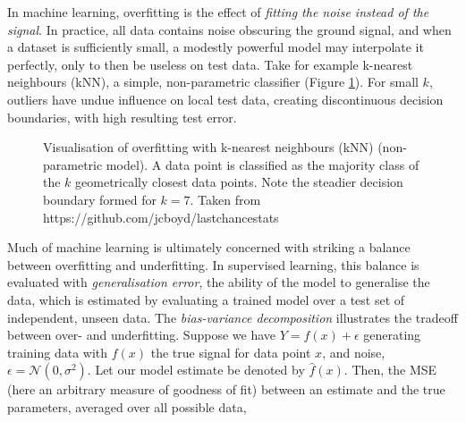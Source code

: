 In machine learning, overfitting is the effect of \emph{fitting the noise instead of the signal}. In practice, all data contains noise obscuring the ground signal, and when a dataset is sufficiently small, a modestly powerful model may interpolate it perfectly, only to then be useless on test data. Take for example k-nearest neighbours (kNN), a simple, non-parametric classifier (Figure \ref{fig:knn}). For small $k$, outliers have undue influence on local test data, creating discontinuous decision boundaries, with high resulting test error.

\begin{figure}%
    \centering
    \qquad
	\caption{Visualisation of overfitting with k-nearest neighbours (kNN) (non-parametric model). A data point is classified as the majority class of the $k$ geometrically closest data points. Note the steadier decision boundary formed for $k = 7$. Taken from https://github.com/jcboyd/lastchancestats}
    \label{fig:knn}%
\end{figure}

Much of machine learning is ultimately concerned with striking a balance between overfitting and underfitting. In supervised learning, this balance is evaluated with \emph{generalisation error}, the ability of the model to generalise the data, which is estimated by evaluating a trained model over a test set of independent, unseen data. The \emph{bias-variance decomposition} illustrates the tradeoff between over- and underfitting. Suppose we have $Y = f(x) + \epsilon$ generating training data with $f(x)$ the true signal for data point $x$, and noise, $\epsilon = \mathcal{N}(0, \sigma^2)$. Let our model estimate be denoted by $\hat{f}(x)$. Then, the MSE (here an arbitrary measure of goodness of fit) between an estimate and the true parameters, averaged over all possible data,

